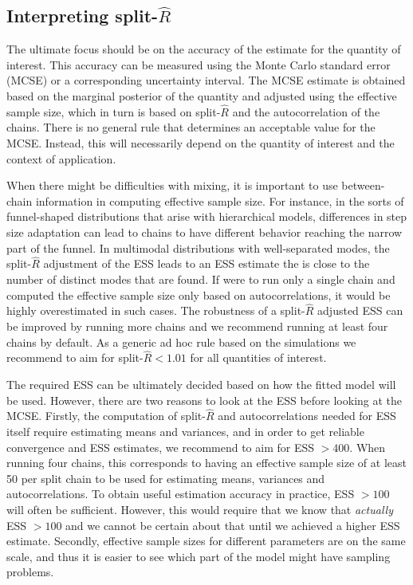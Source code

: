 \documentclass[american,]{article}
\begin{document}
\subsection{Interpreting split-$\widehat{R}$}\label{warning-thresholds}

The ultimate focus should be on the accuracy of the estimate for the
quantity of interest. This accuracy can be measured using the Monte Carlo
standard error (MCSE) or a corresponding uncertainty interval. The MCSE estimate is 
obtained based on the marginal posterior of the quantity and adjusted using the effective sample size,
which in turn is based on split-\(\widehat{R}\) and the autocorrelation
of the chains. There is no general rule that determines an acceptable value 
for the MCSE. Instead, this will necessarily depend on the quantity of interest 
and the context of application.

When there might be difficulties with mixing, it is important to use between-chain information in computing effective sample size. For instance, in the sorts of funnel-shaped distributions that arise with hierarchical models, differences in step size adaptation can lead to chains to have
different behavior reaching the narrow part of the funnel. In multimodal distributions with well-separated modes, the split-\(\widehat{R}\)
adjustment of the ESS leads to an ESS estimate the is close to the number of
distinct modes that are found. If were to run only a single chain and 
computed the effective sample size only based on autocorrelations, it would be highly
overestimated in such cases. The robustness of a split-\(\widehat{R}\) adjusted
ESS can be improved by running more chains and we recommend running at
least four chains by default. As a generic ad hoc rule based on the
simulations we recommend to aim for split-\(\widehat{R} < 1.01\) for all quantities of interest.

The required ESS can be ultimately decided based on how the fitted model will be used. However, there are two reasons to look at
the ESS before looking at the MCSE. Firstly, the computation of
split-\(\widehat{R}\) and autocorrelations needed for ESS
itself require estimating means and variances, and in order to get
reliable convergence and ESS estimates, we recommend to aim for
ESS $>400$. When running four chains, this corresponds to having
an effective sample size of at least 50 per split chain to be used
for estimating means, variances and autocorrelations. To obtain
useful estimation accuracy in practice, ESS $> 100$ will often be sufficient. 
However, this would require that we know that \emph{actually} ESS $ > 100$ and 
we cannot be certain about that until we achieved a higher ESS estimate.
Secondly, effective sample sizes for different parameters are on the
same scale, and thus it is easier to see which part of the model might
have sampling problems.
\end{document}
